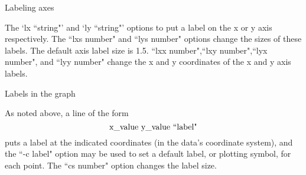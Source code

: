  Labeling axes

The `lx ``string"' and `ly ``string"' options to put a label on the
x or y axis respectively.  The ``lxs number" and ``lys number" options
change the sizes of these labels.  The default axis label size is 1.5.
``lxx number",``lxy number",``lyx number", and ``lyy number" change the
x and y coordinates of the x and y axis labels.

 Labels in the graph

As noted above, a line of the form
$$\hbox{ x\_value    y\_value    ``label" }$$
puts a label at the indicated coordinates (in the data's coordinate
system), and the ``-c label" option may be used to set a default label,
or plotting symbol, for each point.  The ``cs number" option changes
the label size.

